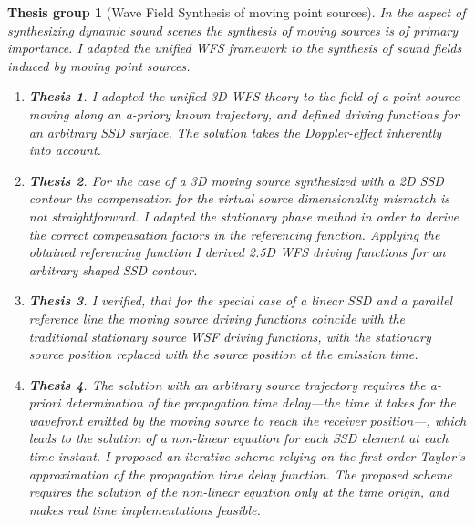 \documentclass[10pt,twoside]{article}
\theoremstyle{thesisgroupstyle}
\newtheorem{thesisgroup}{Thesis group}
\newtheorem{thesis}{Thesis}[thesisgroup]
\begin{document}
\begin{thesisgroup}[Wave Field Synthesis of moving point sources]
In the aspect of synthesizing dynamic sound scenes the synthesis of moving sources is of primary importance.
I adapted the unified WFS framework to the synthesis of sound fields induced by moving point sources.
\begin{enumerate}
\item[] \vspace{-7mm}\begin{thesis}I adapted the unified 3D WFS theory to the field of a point source moving along an a-priory known trajectory, and defined driving functions for an arbitrary SSD surface.
The solution takes the Doppler-effect inherently into account.\end{thesis}
\item[] \vspace{-7mm}\begin{thesis}For the case of a 3D moving source synthesized with a 2D SSD contour the compensation for the virtual source dimensionality mismatch is not straightforward.
I adapted the stationary phase method in order to derive the correct compensation factors in the referencing function. 
Applying the obtained referencing function I derived 2.5D WFS driving functions for an arbitrary shaped SSD contour.\end{thesis}
\item[] \vspace{-7mm}\begin{thesis}I verified, that for the special case of a linear SSD and a parallel reference line the moving source driving functions coincide with the traditional stationary source WSF driving functions, with the stationary source position replaced with the source position at the emission time.\end{thesis}
\item[] \vspace{-7mm}\begin{thesis}The solution with an arbitrary source trajectory requires the a-priori determination of the propagation time delay---the time it takes for the wavefront emitted by the moving source to reach the receiver position---, which leads to the solution of a non-linear equation for each SSD element at each time instant.
I proposed an iterative scheme relying on the first order Taylor's approximation of the propagation time delay function.
The proposed scheme requires the solution of the non-linear equation only at the time origin, and makes real time implementations feasible.\end{thesis}

\end{enumerate}
\end{thesisgroup}
\end{document}
